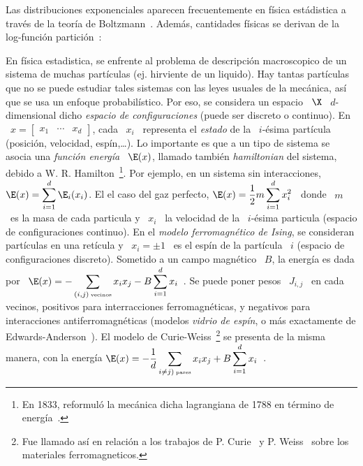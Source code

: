 Las   distribuciones   exponenciales   aparecen   frecuentemente   en   f\'isica
est\'adistica a trav\'es de  la teor\'ia de Boltzmann~\cite{Bol96, Bol98, Gib02,
  LanLif80, MezMon09, Mer10, Mer18}.   Adem\'as, cantidades f\'isicas se derivan
de la  log-funci\'on partici\'on~\cite{Max67, Gib02,  LanLif80, Ell06, MezMon09,
  Mer10, Mer18}:
%
\begin{ejemplo}
  En f\'isica estadistica, se enfrente al problema de descripci\'on macroscopico
  de un sistema de muchas part\'iculas (ej. hirviente de un liquido). Hay tantas
  part\'iculas que no se puede estudiar  tales sistemas con las leyes usuales de
  la  mec\'anica, as\'i que  se usa  un enfoque  probabil\'istico.  Por  eso, se
  considera  un  espacio  \  $\X$   \  $d$-dimensional  dicho  {\em  espacio  de
    configuraciones} (puede ser discreto o  continuo). En \ $x = \begin{bmatrix}
    x_1 & \cdots & x_d\end{bmatrix}$, cada  \ $x_i$ \ representa el {\em estado}
  de la  \ $i$-\'esima part\'icula (posici\'on,  velocidad, esp\'in,\ldots).  Lo
  importante es que a un tipo de sistema se asocia una {\em funci\'on energ\'ia}
  \  $\E(x)$,  llamado  tambi\'en   {\em  hamiltonian}  del  sistema,  debido  a
  W. R. Hamilton~\footnote{En 1833,  reformul\'o la mec\'anica dicha lagrangiana
    de   1788  en  t\'ermino   de  energ\'ia~\cite{Ham1834,   Ham1835,  Lag1788,
      MarRat10}.}. Por ejemplo, en  un sistema sin interacciones, $\displaystyle
  \E(x) = \sum_{i=1}^d \E_i(x_i)$.  El  el caso del gaz perfecto, $\displaystyle
  \E(x) =  \frac12 m  \sum_{i=1}^d x_i^2$ \  donde \  $m$ \ es  la masa  de cada
  particula y \  $x_i$ \ la velocidad de la \  $i$-\'esima particula (espacio de
  configuraciones continuo).   En el {\em modelo ferromagn\'etico  de Ising}, se
  consideran part\'iculas en una ret\'icula y \ $x_i = \pm 1$ \ es el esp\'in de
  la part\'icula  \ $i$  (espacio de configuraciones  discreto).  Sometido  a un
  campo magn\'etico \  $B$, la energ\'ia es dada por \  $\displaystyle \E(x) = -
  \sum_{(i,j)   \:   \mbox{\tiny   vecinos}}    x_i   x_j   -   B   \sum_{i=1}^d
  x_i$~\cite{Len20, Isi25,  Ons44, LanLif80, MezMon09, Mer10,  Mer18}.  Se puede
  poner  pesos \  $J_{i,j}$ \  en  cada vecinos,  positivos para  interracciones
  ferromagn\'eticas,   y  negativos  para   interacciones  antiferromagn\'eticas
  (modelos    {\em    vidrio   de    esp\'in},    o    m\'as   exactamente    de
  Edwards-Anderson~\cite{EdwAnd75,  LanLif80,   MezMon09,  Mer10,  Mer18}).   El
  modelo de Curie-Weiss~\footnote{Fue llamado as\'i en relaci\'on a los trabajos
    de  P.   Curie~\cite{Cur95}  y   P.   Weiss~\cite{Wei96,  Wei07}  sobre  los
    materiales  ferromagneticos.}   se  presenta  de  la misma  manera,  con  la
  energ\'ia $\displaystyle  \E(x) = -  \frac{1}{d} \sum_{i\ne j)  \: \mbox{\tiny
      pares}} x_i x_j + B \sum_{i=1}^d x_i$~\cite{MezMon09, Mer10, Mer18}.


\end{ejemplo}

